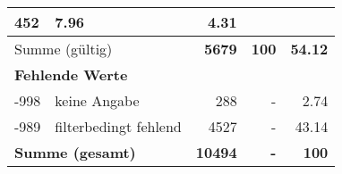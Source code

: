 \begin{longtable}{lXrrr}
       \num{452} &
       \num[round-mode=places,round-precision=2]{7,96} &
         \num[round-mode=places,round-precision=2]{4,31} \\
     \midrule
     \multicolumn{2}{l}{Summe (gültig)} &
       \textbf{\num{5679}} &
     \textbf{100} &
       \textbf{\num[round-mode=places,round-precision=2]{54,12}} \\
     \multicolumn{5}{l}{\textbf{Fehlende Werte}}\\
       -998 &
       keine Angabe &
         \num{288} &
        - &
         \num[round-mode=places,round-precision=2]{2,74} \\
       -989 &
       filterbedingt fehlend &
         \num{4527} &
        - &
         \num[round-mode=places,round-precision=2]{43,14} \\
     \midrule
     \multicolumn{2}{l}{\textbf{Summe (gesamt)}} &
          \textbf{\num{10494}} &
        \textbf{-} &
        \textbf{100} \\
     \bottomrule
     \end{longtable}
     
